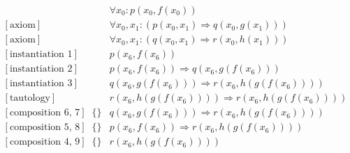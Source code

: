 \documentclass[onehalfspacing]{article}
\begin{document}
\setcounter{equation}{0}
\begin{align}
	[\text{axiom}] && \forall x_0: p(x_0,f(x_0))\\
	[\text{axiom}] && \forall x_0, x_1 : (p(x_0,x_1) \Rightarrow q(x_0,g(x_1)))\\
	[\text{axiom}] && \forall x_0, x_1 : (q(x_0,x_1) \Rightarrow r(x_0,h(x_1)))\\
	[\text{instantiation 1}] && p(x_6, f(x_6))\\
	[\text{instantiation 2}] && p(x_6, f(x_6))\Rightarrow q(x_6,g(f(x_6))) \\
	[\text{instantiation 3}] && q(x_6, g(f(x_6)))\Rightarrow r(x_6,h(g(f(x_6)))) \\
	[\text{tautology}] && r(x_6, h(g(f(x_6))))\Rightarrow r(x_6,h(g(f(x_6))))\\
	[\text{composition 6, 7}] &\{\}&q(x_6, g(f(x_6)))\Rightarrow r(x_6,h(g(f(x_6))))\\
	[\text{composition 5, 8}] &\{\}&p(x_6,f(x_6))\Rightarrow r(x_6, h(g(f(x_6))))\\
	[\text{composition 4, 9}] &\{\}&r(x_6, h(g(f(x_6))))
\end{align}

\pagebreak


\end{document}
